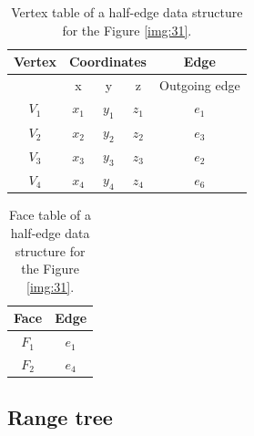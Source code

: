 \begin{table}[]
    \centering
    \begin{tabular}{|c|ccc|c|}
    \hline
    \hline
    Vertex  & \multicolumn{3}{c|}{Coordinates}          & Edge            \\ \hline
          & x            & y            & z           & Outgoing edge   \\ \hline\hline
    $V_1$ & $x_1$        & $y_1$        & $z_1$       & $e_1$           \\ \hline
    $V_2$ & $x_2$        & $y_2$        & $z_2$       & $e_3$           \\ \hline
    $V_3$ & $x_3$        & $y_3$        & $z_3$       & $e_2$           \\ \hline
    $V_4$ & $x_4$        & $y_4$        & $z_4$       & $e_6$           \\ \hline\hline
    \end{tabular}
\caption{Vertex table of a half-edge data structure for the Figure \ref{img:31}.}
\label{tab:6}
\end{table}

\begin{table}[]
    \centering
    \begin{tabular}{|c|c|}
    \hline
    \hline
    Face  & Edge            \\ \hline\hline
    $F_1$ & $e_1$           \\ \hline
    $F_2$ & $e_4$           \\ \hline\hline
    \end{tabular}
\caption{Face table of a half-edge data structure for the Figure \ref{img:31}.}
\label{tab:7}
\end{table}


\subsection{Range tree}
